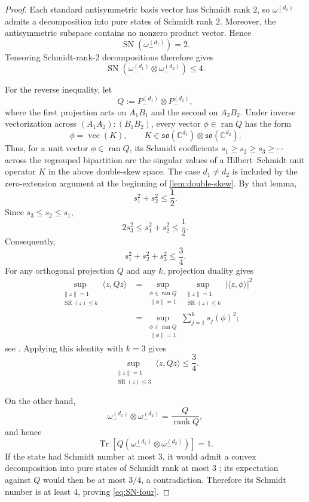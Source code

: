 \documentclass[11pt,reqno]{amsart}
\theoremstyle{remark}
\DeclareMathOperator{\Tr}{Tr}
\DeclareMathOperator{\rank}{rank}
\DeclareMathOperator{\SN}{SN}
\DeclareMathOperator{\SR}{SR}
\DeclareMathOperator{\ran}{ran}
\newcommand{\ip}[2]{\langle #1,#2\rangle}
\newcommand{\norm}[1]{\lVert #1\rVert}
\newcommand{\abs}[1]{\lvert #1\rvert}
\newcommand{\C}{\mathbb C}
\begin{document}
\begin{proof}
Each standard antisymmetric basis vector has Schmidt rank $2$, so
$\omega_-^{(d_1)}$ admits a decomposition into pure states of Schmidt
rank $2$. Moreover, the antisymmetric subspace contains no nonzero
product vector. Hence
\[
    \SN(\omega_-^{(d_1)})=2.
\]
Tensoring Schmidt-rank-$2$ decompositions therefore gives
\[
    \SN\left(
      \omega_-^{(d_1)}\otimes\omega_-^{(d_2)}
    \right)
    \le4.
\]

For the reverse inequality, let
\[
    Q
    :=
    P_-^{(d_1)}\otimes P_-^{(d_2)},
\]
where the first projection acts on $A_1B_1$ and the second on $A_2B_2$.
Under inverse vectorization across
$(A_1A_2):(B_1B_2)$, every vector
$\phi\in\ran Q$ has the form
\[
    \phi=\operatorname{vec}(K),
    \qquad
    K\in
    \mathfrak{so}(\C^{d_1})\otimes\mathfrak{so}(\C^{d_2}).
\]
Thus, for a unit vector $\phi\in\ran Q$, its Schmidt coefficients
$s_1\ge s_2\ge s_3\ge\cdots$ across the regrouped bipartition are the
singular values of a Hilbert--Schmidt unit operator $K$ in the
above double-skew space. The case $d_1\ne d_2$ is included by the
zero-extension argument at the beginning of \cref{lem:double-skew}.
By that lemma,
\[
    s_1^2+s_2^2\le\frac12.
\]
Since $s_3\le s_2\le s_1$,
\[
    2s_3^2
    \le
    s_1^2+s_2^2
    \le
    \frac12.
\]
Consequently,
\[
    s_1^2+s_2^2+s_3^2
    \le
    \frac34.
\]
For any orthogonal projection $Q$ and any $k$, projection duality gives
\begin{align*}
    \sup_{\substack{\norm{z}=1\\ \SR(z)\le k}}
    \ip{z}{Qz}
    &=
    \sup_{\substack{\phi\in\ran Q\\ \norm{\phi}=1}}
    \sup_{\substack{\norm{z}=1\\ \SR(z)\le k}}
    \abs{\ip{z}{\phi}}^2\\
    &=
    \sup_{\substack{\phi\in\ran Q\\ \norm{\phi}=1}}
    \sum_{j=1}^k s_j(\phi)^2;
\end{align*}
see \cite{JohnstonKribs2010}. Applying this identity with $k=3$ gives
\[
    \sup_{\substack{\norm{z}=1\\ \SR(z)\le3}}
    \ip{z}{Qz}
    \le
    \frac34.
\]

On the other hand,
\[
    \omega_-^{(d_1)}\otimes\omega_-^{(d_2)}
    =\frac{Q}{\rank Q},
\]
and hence
\[
    \Tr\left[
      Q\left(
        \omega_-^{(d_1)}\otimes\omega_-^{(d_2)}
      \right)
    \right]
    =1.
\]
If the state had Schmidt number at most $3$, it would admit a convex
decomposition into pure states of Schmidt rank at most $3$
\cite{TerhalHorodecki2000}; its expectation against $Q$ would then be at
most $3/4$, a contradiction. Therefore its Schmidt number is at least
$4$, proving \cref{eq:SN-four}.
\end{proof}
\end{document}
